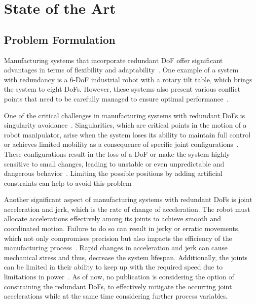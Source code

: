 \documentclass[conference]{IEEEtran}
\begin{document}
\section{State of the Art}

\subsection{Problem Formulation}\label{Problem Formulation}

Manufacturing systems that incorporate redundant DoF offer significant advantages in terms of flexibility and adaptability~\cite{Anjum.2022}. One example of a system with redundancy is a 6-DoF industrial robot with a rotary tilt table, which brings the system to eight DoFs. However, these systems also present various conflict points that need to be carefully managed to ensure optimal performance~\cite{Boscariol.2020}.


One of the critical challenges in manufacturing systems with redundant DoFs is singularity avoidance~\cite{Kireanski.1993, Wang.2022}. Singularities, which are critical points in the motion of a robot manipulator, arise when the system loses its ability to maintain full control or achieves limited mobility as a consequence of specific joint configurations~\cite{Malyshev.2022}. These configurations result in the loss of a DoF or make the system highly sensitive to small changes, leading to unstable or even unpredictable and dangerous behavior~\cite{Zhao.2021, Milenkovic.2021}. Limiting the possible positions by adding artificial constraints can help to avoid this problem~\cite{Faria.2018}

Another significant aspect of manufacturing systems with redundant DoFs is joint acceleration and jerk, which is the rate of change of acceleration. The robot must allocate accelerations effectively among its joints to achieve smooth and coordinated motion. Failure to do so can result in jerky or erratic movements, which not only compromises precision but also impacts the efficiency of the manufacturing process~\cite{Duong.2021}. Rapid changes in acceleration and jerk can cause mechanical stress and thus, decrease the system lifespan. Additionally, the joints can be limited in their ability to keep up with the required speed due to limitations in power~\cite{Staff.1988}. As of now, no publication is considering the option of constraining the redundant DoFs, to effectively mitigate the occurring joint accelerations while at the same time considering further process variables. 
\end{document}
